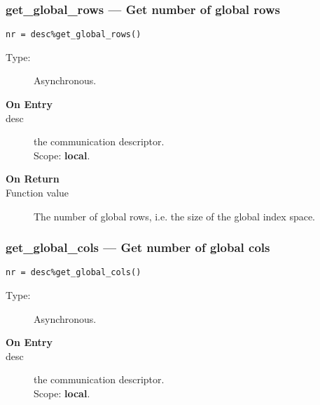 \subsubsection*{get\_global\_rows --- Get number of global rows}

\begin{verbatim}
nr = desc%get_global_rows()
\end{verbatim}

\begin{description}
\item[Type:] Asynchronous.
\item[\bf On Entry]
\item[desc] the communication descriptor.\\
Scope: {\bf local}.\\
\end{description}

\begin{description}
\item[\bf On Return]
\item[Function value] The number of global rows, i.e. the size of the
  global index space. 
\end{description}

\subsubsection*{get\_global\_cols --- Get number of global cols}

\begin{verbatim}
nr = desc%get_global_cols()
\end{verbatim}

\begin{description}
\item[Type:] Asynchronous.
\item[\bf On Entry]
\item[desc] the communication descriptor.\\
Scope: {\bf local}.\\
\end{description}

